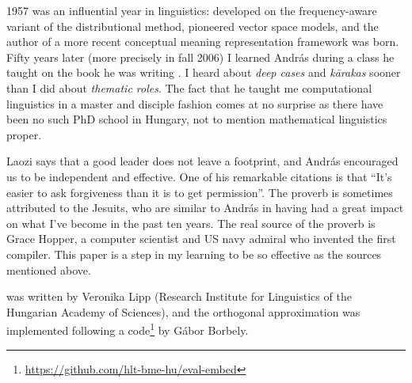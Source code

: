 \documentclass[11pt]{article}
\begin{document}
1957 was an influential year in linguistics: \cite{Harris:1957} developed on the
frequency-aware variant of the distributional method, \cite{Osgood:1957}
pioneered vector space models, and the author of a more recent conceptual
meaning representation framework \citep{Kornai:2010,Kornai:2017} was born.
Fifty years later (more precisely in fall 2006) I learned András during a class
he taught on the book he was writing \citep{Kornai:2007}. I heard about
\emph{deep cases} and \emph{k\={a}rakas} sooner than I did about \emph{thematic
roles}. The fact that he taught me computational linguistics in a master and
disciple fashion comes at no surprise as there have been no such PhD school in
Hungary, not to mention mathematical linguistics proper.

Laozi says that a good leader does not leave a footprint, and András encouraged
us to be independent and effective. One of his remarkable citations is that
``It's easier to ask forgiveness than it is to get permission''. The proverb is
sometimes attributed to the Jesuits, who are similar to András in having had a
great impact on what I've become in the past ten years. The real source of the
proverb is Grace Hopper, a computer scientist and US navy admiral who invented
the first compiler.
This paper is a step in my learning to be so effective as the sources
mentioned above.

\bigskip

 was written by Veronika Lipp (Research Institute for
Linguistics of the Hungarian Academy of Sciences), and the orthogonal
approximation was implemented following a
code\footnote{\url{https://github.com/hlt-bme-hu/eval-embed}} by Gábor Borbely.



\end{document}
